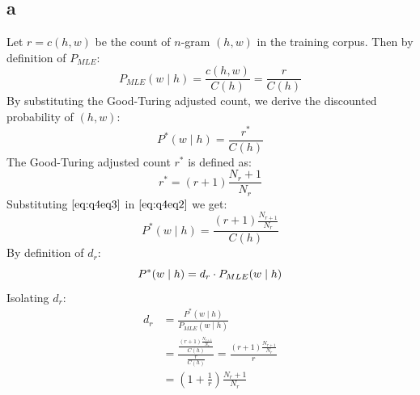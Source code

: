 \documentclass{article}
\numberwithin{equation}{section}
\begin{document}
    \subsection*{a}
    Let $r = c(h, w)$ be the count of $n$-gram $(h,w)$ in the training corpus.
    Then by definition of $P_{MLE}$:
    \begin{equation}
        P_{MLE}(w \mid h) = \frac{c(h, w)}{C(h)} = \frac{r}{C(h)}\label{eq:q4eq1}
    \end{equation}
    By substituting the Good-Turing adjusted count, we derive the discounted probability of $(h,w)$:
    \begin{equation}
        P^*(w \mid h) = \frac{r^*}{C(h)}\label{eq:q4eq2}
    \end{equation}
%
    The Good-Turing adjusted count $r^*$ is defined as:
    \begin{equation}
        r^{*} = (r + 1)\frac{N_r + 1}{N_r}\label{eq:q4eq3}
    \end{equation}
%
    Substituting $\eqref{eq:q4eq3}$ in $\eqref{eq:q4eq2}$ we get:
    \begin{equation}
        P^*(w \mid h) = \frac{(r + 1)\frac{N_{r+1}}{N_r}}{C(h)}\label{eq:q4eq4}
    \end{equation}
%
    By definition of $d_r$:
    \begin{equation}
        P^*(w \mid h) = d_r \cdot P_{MLE}(w \mid h)  \label{eq:q4eq5} \\
    \end{equation}
%
    Isolating $d_r$:
    \begin{align*}
        d_r &= \frac{P^*(w \mid h)}{P_{MLE}(w \mid h)} \\
            &= \frac{\frac{(r + 1)\frac{N_{r + 1}}{N_r}}{C(h)}}{\frac{r}{C(h)}}
            = \frac{(r + 1)\frac{N_{r + 1}}{N_r}}{r} \\
            &= \boxed{(1 + \frac{1}{r})\frac{N_r + 1}{N_r}}
    \end{align*}
\end{document}
